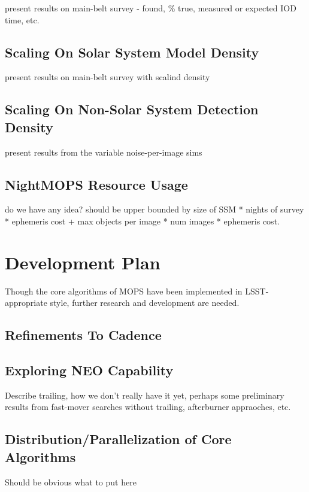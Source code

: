 \documentclass[12pt,preprint]{aastex}
\begin{document}
present results on main-belt survey - found, \% true, measured or expected IOD time, etc.

\subsection{Scaling On Solar System Model Density}

present results on main-belt survey with scalind density

\subsection{Scaling On Non-Solar System Detection Density}

present results from the variable noise-per-image sims

\subsection{NightMOPS Resource Usage}

do we have any idea?  should be upper bounded by size of SSM * nights
of survey * ephemeris cost + max objects per image * num images *
ephemeris cost.
















\section{Development Plan}

Though the core algorithms of MOPS have been implemented in
LSST-appropriate style, further research and development are needed.

\subsection{Refinements To Cadence}

\subsection{Exploring NEO Capability}

Describe trailing, how we don't really have it yet, perhaps some
preliminary results from fast-mover searches without trailing,
afterburner appraoches, etc.

\subsection{Distribution/Parallelization of Core Algorithms}

Should be obvious what to put here




\end{document}
